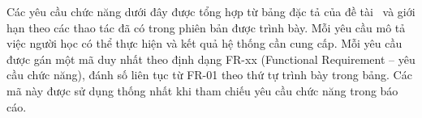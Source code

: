 %
%

Các yêu cầu chức năng dưới đây được tổng hợp từ bảng đặc tả của đề tài~\cite{nihongo-functional2026} và giới hạn theo các thao tác đã có trong phiên bản được trình bày. Mỗi yêu cầu mô tả việc người học có thể thực hiện và kết quả hệ thống cần cung cấp. Mỗi yêu cầu được gán một mã duy nhất theo định dạng FR-xx (Functional Requirement -- yêu cầu chức năng), đánh số liên tục từ FR-01 theo thứ tự trình bày trong bảng. Các mã này được sử dụng thống nhất khi tham chiếu yêu cầu chức năng trong báo cáo.

